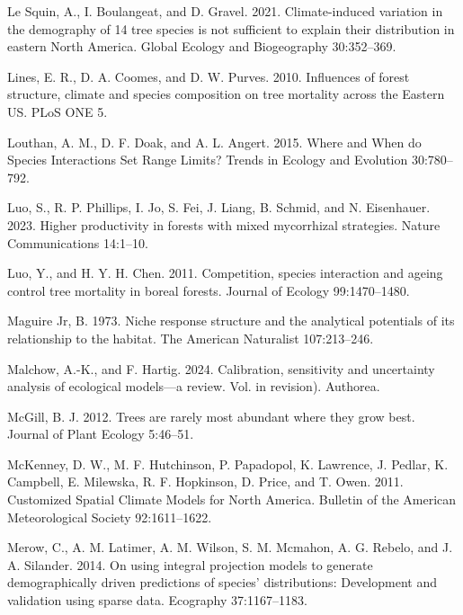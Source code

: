 \documentclass[12pt]{article}
\newlength{\cslhangindent}
\newenvironment{cslreferences}%
  {\setlength{\parindent}{0pt}%
  \everypar{\setlength{\hangindent}{\cslhangindent}}\ignorespaces}%
  {\par}
\begin{document}
\begin{cslreferences}
\leavevmode\hypertarget{ref-LeSquin2021}{}%
Le Squin, A., I. Boulangeat, and D. Gravel. 2021. Climate-induced
variation in the demography of 14 tree species is not sufficient to
explain their distribution in eastern North America. Global Ecology and
Biogeography 30:352--369.

\leavevmode\hypertarget{ref-Lines2010}{}%
Lines, E. R., D. A. Coomes, and D. W. Purves. 2010. Influences of forest
structure, climate and species composition on tree mortality across the
Eastern US. PLoS ONE 5.

\leavevmode\hypertarget{ref-Louthan2015}{}%
Louthan, A. M., D. F. Doak, and A. L. Angert. 2015. Where and When do
Species Interactions Set Range Limits? Trends in Ecology and Evolution
30:780--792.

\leavevmode\hypertarget{ref-Luo2023}{}%
Luo, S., R. P. Phillips, I. Jo, S. Fei, J. Liang, B. Schmid, and N.
Eisenhauer. 2023. Higher productivity in forests with mixed mycorrhizal
strategies. Nature Communications 14:1--10.

\leavevmode\hypertarget{ref-Luo2011}{}%
Luo, Y., and H. Y. H. Chen. 2011. Competition, species interaction and
ageing control tree mortality in boreal forests. Journal of Ecology
99:1470--1480.

\leavevmode\hypertarget{ref-maguire1973niche}{}%
Maguire Jr, B. 1973. Niche response structure and the analytical
potentials of its relationship to the habitat. The American Naturalist
107:213--246.

\leavevmode\hypertarget{ref-malchow2024calibration}{}%
Malchow, A.-K., and F. Hartig. 2024. Calibration, sensitivity and
uncertainty analysis of ecological models---a review. Vol. in revision).
Authorea.

\leavevmode\hypertarget{ref-McGill2012}{}%
McGill, B. J. 2012. Trees are rarely most abundant where they grow best.
Journal of Plant Ecology 5:46--51.

\leavevmode\hypertarget{ref-McKenney2011}{}%
McKenney, D. W., M. F. Hutchinson, P. Papadopol, K. Lawrence, J. Pedlar,
K. Campbell, E. Milewska, R. F. Hopkinson, D. Price, and T. Owen. 2011.
Customized Spatial Climate Models for North America. Bulletin of the
American Meteorological Society 92:1611--1622.

\leavevmode\hypertarget{ref-Merow2014}{}%
Merow, C., A. M. Latimer, A. M. Wilson, S. M. Mcmahon, A. G. Rebelo, and
J. A. Silander. 2014. On using integral projection models to generate
demographically driven predictions of species' distributions:
Development and validation using sparse data. Ecography 37:1167--1183.


\end{cslreferences}
\end{document}
